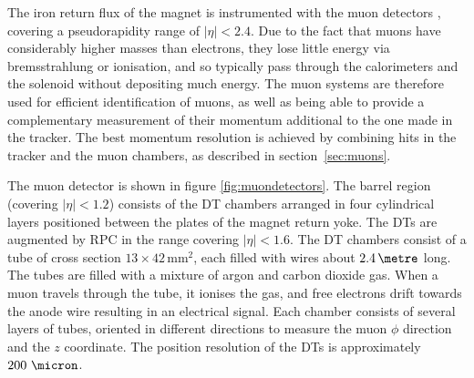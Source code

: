 The iron return flux of the magnet is instrumented with the muon detectors
\cite{Chatrchyan:2008aa}, covering a pseudorapidity range of $|\eta|<2.4$. Due
to the fact that muons have considerably higher masses than electrons, they lose
little energy via bremsstrahlung or ionisation, and so typically pass through
the calorimeters and the solenoid without depositing much energy. The muon
systems are therefore used for efficient identification of muons, as well as
being able to provide a complementary measurement of their momentum additional
to the one made in the tracker. The best momentum resolution is achieved by 
combining hits in the tracker and the muon chambers, as described in section~\ref{sec:muons}. 

The muon detector is shown in figure \ref{fig:muondetectors}. The barrel region
(covering $|\eta|<1.2$) consists of the \ac{DT} chambers arranged in four
cylindrical layers positioned between the plates of the magnet return yoke. The
\ac{DT}s are augmented by \ac{RPC} in the range covering $|\eta|<1.6$. The
\ac{DT} chambers consist of a tube of cross section $13\times42\,\text{mm}^{2}$,
each filled with wires about $2.4\,\metre$ long. The tubes are filled with a
mixture of argon and carbon dioxide gas. When a muon travels through the tube,
it ionises the gas, and free electrons drift towards the anode wire resulting in
an electrical signal. Each chamber consists of several layers of tubes, oriented
in different directions to measure the muon $\phi$ direction and the $z$
coordinate. The position resolution of the \ac{DT}s is approximately
$200~\micron$.

